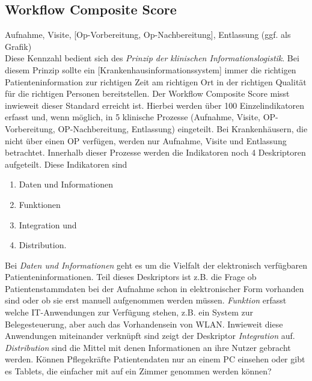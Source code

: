 	\subsection{Workflow Composite Score}
		Aufnahme, Visite, [Op-Vorbereitung, Op-Nachbereitung], Entlassung (ggf. als Grafik)\\
		Diese Kennzahl bedient sich des \textit{Prinzip der klinischen Informationslogistik}. Bei diesem Prinzip \glqq{}sollte ein [Krankenhausinformationssystem] immer die richtigen Patienteninformation zur richtigen Zeit am richtigen Ort in der richtigen Qualität für die richtigen Personen bereitstellen.\grqq\parencite[36]{huebner2019} Der Workflow Composite Score misst inwieweit dieser Standard erreicht ist. Hierbei werden über 100 Einzelindikatoren erfasst und, wenn möglich, in 5 klinische Prozesse (Aufnahme, Visite, OP-Vorbereitung, OP-Nachbereitung, Entlassung) eingeteilt. Bei Krankenhäusern, die nicht über einen OP verfügen, werden nur Aufnahme, Visite und Entlassung betrachtet. Innerhalb dieser Prozesse werden die Indikatoren noch 4 Deskriptoren aufgeteilt. Diese Indikatoren sind
		\begin{enumerate}
			\item Daten und Informationen
			\item Funktionen
			\item Integration und
			\item Distribution.
		\end{enumerate}
		Bei \textit{Daten und Informationen} geht es um die Vielfalt der elektronisch verfügbaren Patienteninformationen. Teil dieses Deskriptors ist z.B. die Frage ob Patientenstammdaten bei der Aufnahme schon in elektronischer Form vorhanden sind oder ob sie erst manuell aufgenommen werden müssen. \textit{Funktion} erfasst welche IT-Anwendungen zur Verfügung stehen, z.B. ein System zur Belegesteuerung, aber auch das Vorhandensein von WLAN. Inwieweit diese Anwendungen miteinander verknüpft sind zeigt der Deskriptor \textit{Integration} auf. \textit{Distribution} sind die Mittel mit denen Informationen an ihre Nutzer gebracht werden. Können Pflegekräfte Patientendaten nur an einem PC einsehen oder gibt es Tablets, die einfacher mit auf ein Zimmer genommen werden können?


